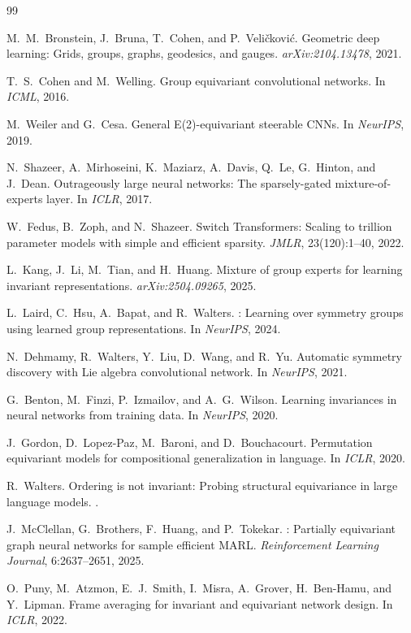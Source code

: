 \documentclass[10pt, letterpaper]{article}
\begin{document}
\begin{thebibliography}{99}

M.~M.~Bronstein, J.~Bruna, T.~Cohen, and P.~Veli\v{c}kovi\'{c}.
\newblock Geometric deep learning: Grids, groups, graphs, geodesics, and gauges.
\newblock \emph{arXiv:2104.13478}, 2021.

T.~S.~Cohen and M.~Welling.
\newblock Group equivariant convolutional networks.
\newblock In \emph{ICML}, 2016.

M.~Weiler and G.~Cesa.
\newblock General {E(2)}-equivariant steerable {CNNs}.
\newblock In \emph{NeurIPS}, 2019.

N.~Shazeer, A.~Mirhoseini, K.~Maziarz, A.~Davis, Q.~Le, G.~Hinton, and J.~Dean.
\newblock Outrageously large neural networks: The sparsely-gated mixture-of-experts layer.
\newblock In \emph{ICLR}, 2017.

W.~Fedus, B.~Zoph, and N.~Shazeer.
\newblock Switch {T}ransformers: Scaling to trillion parameter models with simple and efficient sparsity.
\newblock \emph{JMLR}, 23(120):1--40, 2022.

L.~Kang, J.~Li, M.~Tian, and H.~Huang.
\newblock Mixture of group experts for learning invariant representations.
\newblock \emph{arXiv:2504.09265}, 2025.

L.~Laird, C.~Hsu, A.~Bapat, and R.~Walters.
: Learning over symmetry groups using learned group representations.
\newblock In \emph{NeurIPS}, 2024.

N.~Dehmamy, R.~Walters, Y.~Liu, D.~Wang, and R.~Yu.
\newblock Automatic symmetry discovery with {L}ie algebra convolutional network.
\newblock In \emph{NeurIPS}, 2021.

G.~Benton, M.~Finzi, P.~Izmailov, and A.~G.~Wilson.
\newblock Learning invariances in neural networks from training data.
\newblock In \emph{NeurIPS}, 2020.

J.~Gordon, D.~Lopez-Paz, M.~Baroni, and D.~Bouchacourt.
\newblock Permutation equivariant models for compositional generalization in language.
\newblock In \emph{ICLR}, 2020.

R.~Walters.
\newblock Ordering is not invariant: Probing structural equivariance in large language models.
.

J.~McClellan, G.~Brothers, F.~Huang, and P.~Tokekar.
: Partially equivariant graph neural networks for sample efficient {MARL}.
\newblock \emph{Reinforcement Learning Journal}, 6:2637--2651, 2025.

O.~Puny, M.~Atzmon, E.~J.~Smith, I.~Misra, A.~Grover, H.~Ben-Hamu, and Y.~Lipman.
\newblock Frame averaging for invariant and equivariant network design.
\newblock In \emph{ICLR}, 2022.

\end{thebibliography}
\end{document}
